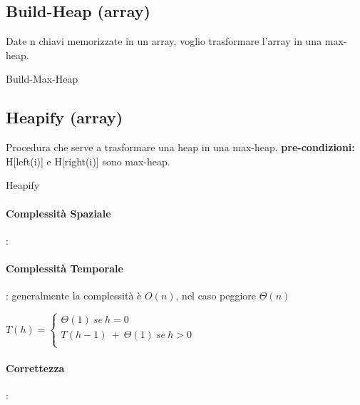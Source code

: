 \documentclass{article}
\DeclarePairedDelimiter\floor{\lfloor}{\rfloor}
\begin{document}
\hypertarget{builheap}{}\subsection{Build-Heap (array)} %
Date n chiavi memorizzate in un array, voglio trasformare l'array in una max-heap.

\begin{algorithm}[H]
\caption{Build-Max-Heap}
\end{algorithm}

\hypertarget{heapify}{}\subsection{Heapify (array)} %
Procedura che serve a trasformare una heap in una max-heap. \newline
\textbf{pre-condizioni:} H[left(i)] e H[right(i)] sono max-heap.


\begin{algorithm}[H]
\caption{Heapify}
\end{algorithm}

\paragraph{Complessità Spaziale}: 
\paragraph{Complessità Temporale}: generalmente la complessità è $O(n)$, nel caso peggiore $\Theta(n)$

$T(h) =\begin{cases}
    \Theta(1) \ se \ h = 0 \\
    T(h-1) \ + \ \Theta(1) \ se \ h > 0 \\
\end{cases}$
\paragraph{Correttezza}:
\end{document}
